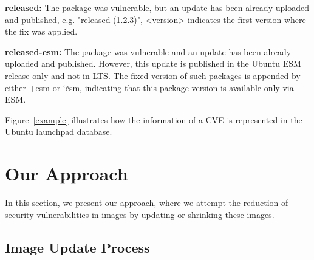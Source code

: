 \documentclass[a4paper,num-refs]{oup-contemporary}
\begin{document}
\textbf{released:} The package was vulnerable, but
		an update has been already uploaded and published, e.g. "released (1.2.3)",
		<version> indicates the first version where the fix was applied.

\textbf{released-esm:} The package was vulnerable and
		an update has been already uploaded and published. However,
		this update is published in the Ubuntu ESM release only and not in LTS.
		The fixed version of such packages is appended by either
		+esm or \char`\~esm, indicating that this package version is available
		only via ESM.

Figure~\ref{example} illustrates how the information of a CVE is represented
in the Ubuntu launchpad database.





\section{Our Approach}

In this section, we present our approach, where we attempt the reduction
of security vulnerabilities in images by updating or
shrinking these images.

\subsection{Image Update Process}
\end{document}
